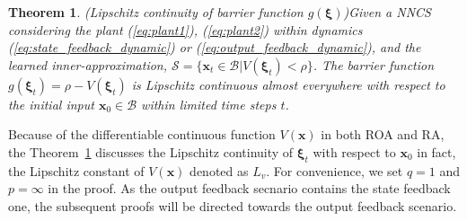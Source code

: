 \documentclass[conference]{IEEEtran}
\newtheorem{theorem}{\bf Theorem}
\newcommand{\nncs}{\textsc{NNCS}\xspace}
\newcommand{\roa}{\textsc{ROA}\xspace}
\newcommand{\ra}{\textsc{RA}\xspace}
\newcommand{\myvec}[1]{\boldsymbol{#1}}
\newcommand{\calB}{\mathcal{B}}
\newcommand{\calS}{\mathcal{S}}
\begin{document}
\begin{theorem}(Lipschitz continuity of barrier function 
    $g(\myvec{\xi})$)\label{theorem:nncs Lipschitz continuity}
    Given a \nncs considering the plant (\ref{eq:plant1}), 
    (\ref{eq:plant2}) within dynamics (\ref{eq:state_feedback_dynamic}) or 
    (\ref{eq:output_feedback_dynamic}), and the learned inner-approximation, 
    $\calS=\{\myvec{x}_{t}\in \calB | V(\myvec{\xi}_{t}) < \rho\}$. 
    The barrier function $g(\myvec{\xi}_{t}) = \rho - V(\myvec{\xi}_{t})$ 
    is Lipschitz continuous almost everywhere with respect to the initial 
    input $\myvec{x}_{0}\in \calB$ within limited time steps $t$. 
    
\end{theorem}

Because of the differentiable continuous 
function $V(\myvec{x})$ in both \roa and \ra, 
the Theorem~\ref{theorem:nncs Lipschitz continuity} 
discusses the Lipschitz continuity of $\myvec{\xi}_{t}$ 
with respect to $\myvec{x}_{0}$ in fact, 
the Lipschitz constant of $V(\myvec{x})$ denoted as $L_{v}$. 
For convenience, we set $q=1$ and $p = \infty$ in the proof. 
As the output feedback secnario contains the state feedback one, 
the subsequent proofs will be directed towards the output feedback scenario. 
\end{document}
